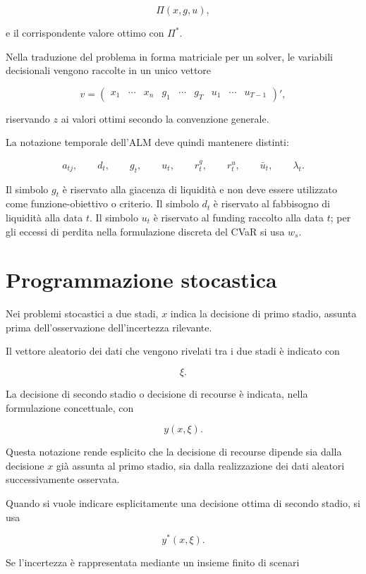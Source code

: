 \documentclass[12pt,a4paper]{article}
\newcommand{\1}{\mathbf{1}}
\begin{document}
\[
\Pi(x,g,u),
\]

e il corrispondente valore ottimo con $\Pi^{*}$.

Nella traduzione del problema in forma matriciale per un solver, le variabili
decisionali vengono raccolte in un unico vettore

\[
v
=
\begin{pmatrix}
x_1 & \cdots & x_n &
g_1 & \cdots & g_T &
u_1 & \cdots & u_{T-1}
\end{pmatrix}',
\]

riservando $z$ ai valori ottimi secondo la convenzione generale.

La notazione temporale dell'ALM deve quindi mantenere distinti:

\[
a_{tj},\qquad
d_t,\qquad
g_t,\qquad
u_t,\qquad
r_t^{g},\qquad
r_t^{u},\qquad
\bar u_t,\qquad
\lambda_t.
\]

Il simbolo $g_t$ \`e riservato alla giacenza di liquidit\`a e non deve
essere utilizzato come funzione-obiettivo o criterio. Il simbolo $d_t$ \`e
riservato al fabbisogno di liquidit\`a alla data $t$. Il simbolo $u_t$
\`e riservato al funding raccolto alla data $t$; per gli eccessi di perdita
nella formulazione discreta del CVaR si usa $w_s$.

\section{Programmazione stocastica}

Nei problemi stocastici a due stadi, $x$ indica la decisione di primo stadio,
assunta prima dell'osservazione dell'incertezza rilevante.

Il vettore aleatorio dei dati che vengono rivelati tra i due stadi \`e
indicato con

\[
\xi.
\]

La decisione di secondo stadio o decisione di recourse \`e indicata, nella
formulazione concettuale, con

\[
y(x,\xi).
\]

Questa notazione rende esplicito che la decisione di recourse dipende sia
dalla decisione $x$ gi\`a assunta al primo stadio, sia dalla realizzazione
dei dati aleatori successivamente osservata.

Quando si vuole indicare esplicitamente una decisione ottima di secondo
stadio, si usa

\[
y^*(x,\xi).
\]

Se l'incertezza \`e rappresentata mediante un insieme finito di scenari
\end{document}
